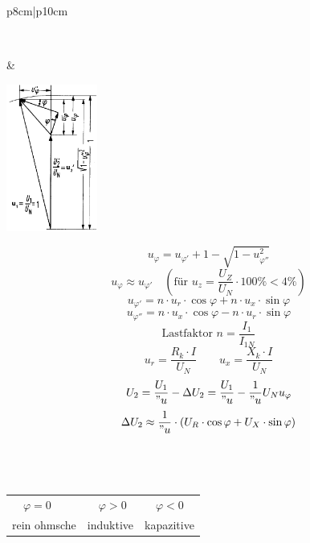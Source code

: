 \begin{tabular}{p{8cm}|p{10cm}}
\begin{minipage}{8cm}
\begin{multicols}{3}
	            	  \\  	  
	            	\end{multicols}
	            \end{minipage}  & 
	            \hspace{0.2cm} 
	            \vspace{-4cm}
				\begin{minipage}{10cm} 
		        	\begin{minipage}{2.5cm}
						\includegraphics[width=3cm]{bilder/KappschesDreieck.png}
		            \end{minipage}
					\begin{minipage}{7.5cm}
		      			$$u_{\varphi} = u_{\varphi'} + 1 - \sqrt{1 - u_{\varphi''}^2}$$
		      			$$ \boxed{u_\varphi \approx u_{\varphi'}}\quad (\text{für }u_z
		      			=\frac{U_Z}{U_{N}} \cdot 100\% < 4 \%)$$
		      			$$u_{\varphi'} = n \cdot u_r \cdot \cos \varphi + n \cdot u_x
		      			\cdot \sin \varphi$$ $$u_{\varphi''} = n \cdot u_x \cdot \cos \varphi - n \cdot u_r \cdot \sin \varphi$$
		      			$$\text{Lastfaktor } n = \frac{I_1}{I_{1N}}$$
		      			$$ u_r = \frac{R_k \cdot I}{U_N} \qquad u_x = \frac{X_k \cdot I}{U_N} $$
		      			$$ U_2 = \frac{U_1}{"u} - \Delta U_2 = \frac{U_1}{"u} - \frac{1}{"u}
		      			U_N u_\varphi $$
		      			$$ \Delta U_2 \approx \frac{1}{"u} \cdot (U_R \cdot \cos \varphi + U_X \cdot \sin \varphi)$$\\
		      		\end{minipage}         
                \end{minipage}\\
				\begin{minipage}{8cm}
					\vspace*{-2cm}
 					\begin{tabular}[c]{p{2.66cm}p{2.66cm}p{2.66cm}}
                     	$\quad \varphi = 0$ & $\quad\varphi > 0$ & $\quad\varphi
                     	< 0$\\ rein ohmsche & induktive & kapazitive\\

\end{tabular}
\end{minipage}
\end{tabular}
